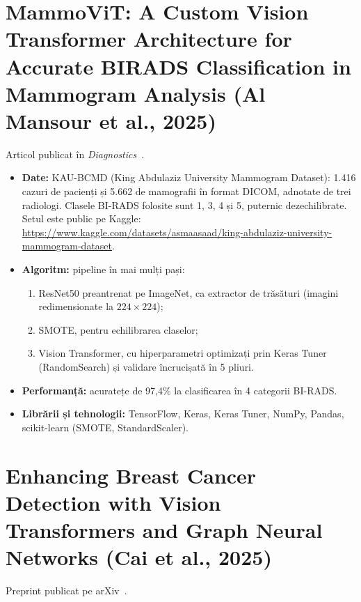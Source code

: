 \documentclass[runningheads,a4paper,11pt]{report}
\begin{document}
\section{MammoViT: A Custom Vision Transformer Architecture for Accurate BIRADS Classification in Mammogram Analysis (Al Mansour et al., 2025)}
\label{section:mammovit}

Articol publicat în \emph{Diagnostics}~\cite{mammovit2025}.

\begin{itemize}
	\item \textbf{Date:} KAU-BCMD (King Abdulaziz University Mammogram Dataset): 1.416 cazuri de pacienți și 5.662 de mamografii în format DICOM, adnotate de trei radiologi. Clasele BI-RADS folosite sunt 1, 3, 4 și 5, puternic dezechilibrate. Setul este public pe Kaggle: \url{https://www.kaggle.com/datasets/asmaasaad/king-abdulaziz-university-mammogram-dataset}.
	\item \textbf{Algoritm:} pipeline în mai mulți pași:
	\begin{enumerate}
		\item ResNet50 preantrenat pe ImageNet, ca extractor de trăsături (imagini redimensionate la $224 \times 224$);
		\item SMOTE, pentru echilibrarea claselor;
		\item Vision Transformer, cu hiperparametri optimizați prin Keras Tuner (RandomSearch) și validare încrucișată în 5 pliuri.
	\end{enumerate}
	\item \textbf{Performanță:} acuratețe de 97,4\% la clasificarea în 4 categorii BI-RADS.
	\item \textbf{Librării și tehnologii:} TensorFlow, Keras, Keras Tuner, NumPy, Pandas, scikit-learn (SMOTE, StandardScaler).
\end{itemize}

\section{Enhancing Breast Cancer Detection with Vision Transformers and Graph Neural Networks (Cai et al., 2025)}
\label{section:cai}

Preprint publicat pe arXiv~\cite{cai2025}.
\end{document}
